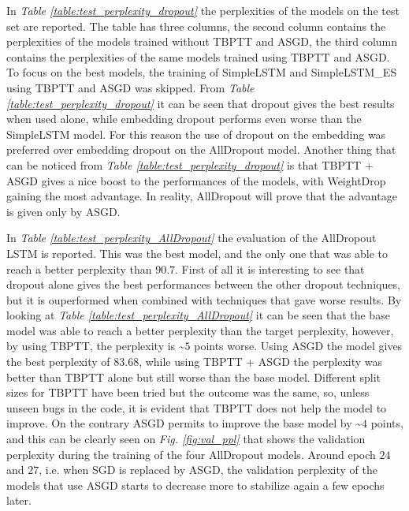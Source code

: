 \documentclass[a4paper]{article}
\begin{document}
In \textit{Table \ref{table:test_perplexity_dropout}} the perplexities of the models on the test set are reported. 
The table has three columns, the second column contains the perplexities of the models trained without TBPTT and ASGD,
the third column contains the perplexities of the same models trained using TBPTT and ASGD. To focus on the best models, the training of SimpleLSTM and SimpleLSTM\_ES
using TBPTT and ASGD was skipped. 
From \textit{Table \ref{table:test_perplexity_dropout}} it can be seen that dropout gives the best results when used alone, while embedding dropout performs even worse
than the SimpleLSTM model. For this reason the use of dropout on the embedding was preferred over embedding dropout on the AllDropout model. Another thing that can be 
noticed from \textit{Table \ref{table:test_perplexity_dropout}} is that TBPTT + ASGD gives a nice boost to the performances of the models, with WeightDrop gaining the 
most advantage. In reality, AllDropout will prove that the advantage is given only by ASGD.

In \textit{Table \ref{table:test_perplexity_AllDropout}} the evaluation of the AllDropout LSTM is reported. This was the best model, and the only one that was able to 
reach a better perplexity than $90.7$. 
First of all it is interesting to see that dropout alone gives the best performances between the other dropout techniques, but it is ouperformed when combined with 
techniques that gave worse results. 
By looking at \textit{Table \ref{table:test_perplexity_AllDropout}} it can be seen that the base model was able to reach a better perplexity than the target perplexity, 
however, by using TBPTT, the perplexity is \textasciitilde{}$5$ points worse. Using ASGD the model gives the best perplexity of $83.68$, while using TBPTT + ASGD the perplexity was 
better than TBPTT alone but still worse than the base model. Different split sizes for TBPTT have been tried but the outcome was the same, so, unless unseen bugs in the code, 
it is evident that TBPTT does not help the model to improve. On the contrary ASGD permits to improve the base model by \textasciitilde{}$4$ points, and this can be clearly seen on 
\textit{Fig. \ref{fig:val_ppl}} that shows the validation perplexity during the training of the four AllDropout models. Around epoch 
$24$ and $27$, i.e. when SGD is replaced by ASGD, the validation perplexity of the models that use ASGD starts to decrease more
to stabilize again a few epochs later.
\end{document}
